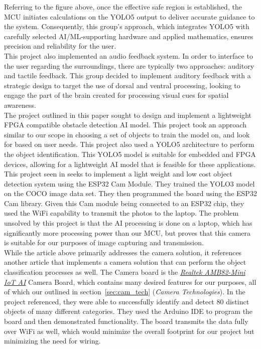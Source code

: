 \noindent Referring to the figure above, once the effective safe region is established, the MCU initiates calculations on the YOLO5 output to deliver accurate guidance to the system. Consequently, this group's approach, which integrates YOLO5 with carefully selected AI/ML-supporting hardware and applied mathematics, ensures precision and reliability for the user. \\

\noindent This project also implemented an audio feedback system. In order to interface to the user regarding the surroundings, there are typically two approaches: auditory and tactile feedback. This group decided to implement auditory feedback with a strategic design to target the use of dorsal and ventral processing, looking to engage the part of the brain created for processing visual cues for spatial awareness.\\

\noindent The project outlined in this paper \cite{CVRef2} sought to design and implement a lightweight FPGA compatible obstacle detection AI model. This project took an approach similar to our scope in choosing a set of objects to train the model on, and look for based on user needs. This project also used a YOLO5 architecture to perform the object identification. This YOLO5 model is suitable for embedded and FPGA devices, allowing for a lightweight AI model that is feasible for these applications. \\


\noindent This project seen in \cite{ESP32CamRef1} seeks to implement a light weight and low cost object detection system using the ESP32 Cam Module. They trained the YOLO3 model on the COCO image data set. They then programmed the board using the ESP32 Cam library. Given this Cam module being connected to an ESP32 chip, they used the WiFi capability to transmit the photos to the laptop. The problem unsolved by this project is that the AI processing is done on a laptop, which has significantly more processing power than our MCU, but proves that this camera is suitable for our purposes of image capturing and transmission. \\

\noindent While the article above primarily addresses the camera solution, it references another article \cite{RealTekCamRef1} that implements a camera solution that can perform the object classification processes as well. The Camera board is the \underline{\textit{Realtek AMB82-Mini IoT AI}} Camera Board, which contains many desired features for our purposes, all of which our outlined in section~\ref{sec:cam_tech} (\textit{Camera Technologies}). In the project referenced, they were able to successfully identify and detect 80 distinct objects of many different categories. They used the Arduino IDE to program the board and then demonstrated functionality. The board transmits the data fully over WiFi as well, which would minimize the overall footprint for our project but minimizing the need for wiring.\\


